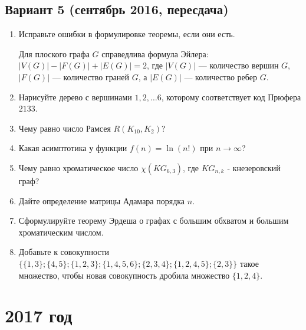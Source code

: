 \documentclass[oneside]{book}
\begin{document}
\section{Вариант 5 (сентябрь 2016, пересдача)}
\begin{enumerate}
\item Исправьте ошибки в формулировке теоремы, если они есть. 

Для плоского графа $G$ справедлива формула Эйлера: $|V(G)| - |F(G)| + |E(G)| = 2$, где $|V(G)|$ --- количество вершин $G$, $|F(G)|$ --- количество граней $G$, а $|E(G)|$ --- количество ребер $G$.
\item Нарисуйте дерево с вершинами $1, 2, \ldots 6$, которому соответствует код Прюфера $2 1 3 3$.
\item Чему равно число Рамсея $R(K_10, K_2)$?
\item Какая асимптотика у функции $f(n) = \ln(n!)$ при $n\rightarrow \infty$?
\item Чему равно хроматическое число $\chi(KG_{6,3})$, где $KG_{n,k}$ - кнезеровский граф?
\item Дайте определение матрицы Адамара порядка $n$.
\item Сформулируйте теорему Эрдеша о графах с большим обхватом и большим хроматическим числом.
\item Добавьте к совокупности $\{\{1, 3\}; \{4, 5\}; \{1, 2, 3\}; \{1, 4, 5, 6\}; \{2, 3 ,4\}; \{1, 2, 4, 5\}; \{2, 3\}\}$ такое множество, чтобы новая совокупность дробила множество $\{1, 2, 4\}$.
\end{enumerate}

\chapter{2017 год}
\end{document}
